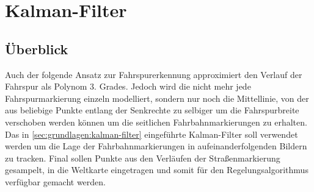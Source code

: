 \section{Kalman-Filter}
\autocite{petersfalkoFPGAbasierteBildverarbeitungspipelineZur2009}
\autocite{risackRobustLaneRecognition}

\subsection{Überblick} \label{ssec:fahrspurerkennung:kalman-filter:ueberblick}
Auch der folgende Ansatz zur Fahrspurerkennung approximiert den Verlauf der Fahrspur als Polynom 3. Grades. Jedoch wird die nicht mehr jede Fahrspurmarkierung einzeln modelliert, sondern nur noch die Mittellinie, von der aus beliebige Punkte entlang der Senkrechte zu selbiger um die Fahrspurbreite verschoben werden können um die seitlichen Fahrbahnmarkierungen zu erhalten.
Das in \ref{sec:grundlagen:kalman-filter} eingeführte Kalman-Filter soll verwendet werden um die Lage der Fahrbahnmarkierungen in aufeinanderfolgenden Bildern zu tracken. Final sollen Punkte aus den Verläufen der Straßenmarkierung gesampelt, in die Weltkarte eingetragen und somit für den Regelungsalgorithmus verfügbar gemacht werden.

